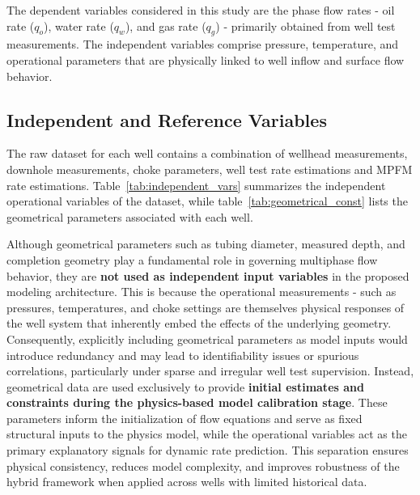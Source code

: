 \documentclass[12pt,APA]{uomthesis}
\begin{document}
The dependent variables considered in this study are the phase flow rates - oil rate ($q_o$), water rate ($q_w$), and gas rate ($q_g$) - primarily obtained from well test measurements. 
The independent variables comprise pressure, temperature, and operational parameters that are physically linked to well inflow and surface flow behavior.

\subsection{Independent and Reference Variables}
\label{subsec:dataset_variables}

The raw dataset for each well contains a combination of wellhead measurements, downhole
measurements, choke parameters, well test rate estimations and MPFM rate estimations. 
Table~\ref{tab:independent_vars} summarizes the independent operational variables of the dataset, while table~\ref{tab:geometrical_const} lists the geometrical parameters associated with each well.

Although geometrical parameters such as tubing diameter, measured depth, and completion geometry play a fundamental role in governing multiphase flow behavior, they are \textbf{not used as independent input variables} in the proposed modeling architecture. This is because the operational measurements - such as pressures, temperatures, and choke settings are themselves physical responses of the well system that inherently embed the effects of the underlying geometry. Consequently, explicitly including geometrical parameters as model inputs would introduce redundancy and may lead to identifiability issues or spurious correlations, particularly under sparse and irregular well test supervision.
Instead, geometrical data are used exclusively to provide \textbf{initial estimates and constraints during the physics-based model calibration stage}. These parameters inform the initialization of flow equations and serve as fixed structural inputs to the physics model, while the operational variables act as the primary explanatory signals for dynamic rate prediction. This separation ensures physical consistency, reduces model complexity, and improves robustness of the hybrid framework when applied across wells with limited historical data.
 

\begin{table}[!htb]
\end{table}
\end{document}
